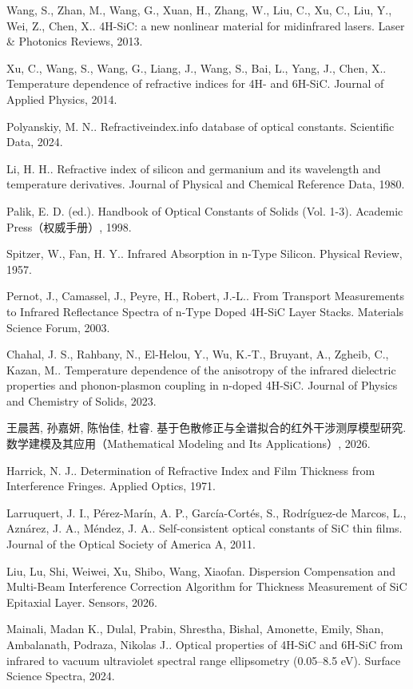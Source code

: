 Wang, S., Zhan, M., Wang, G., Xuan, H., Zhang, W., Liu, C., Xu, C., Liu,
Y., Wei, Z., Chen, X.. 4H-SiC: a new nonlinear material for midinfrared
lasers. Laser \& Photonics Reviews, 2013.

Xu, C., Wang, S., Wang, G., Liang, J., Wang, S., Bai, L., Yang, J.,
Chen, X.. Temperature dependence of refractive indices for 4H- and
6H-SiC. Journal of Applied Physics, 2014.

Polyanskiy, M. N.. Refractiveindex.info database of optical constants.
Scientific Data, 2024.

Li, H. H.. Refractive index of silicon and germanium and its wavelength
and temperature derivatives. Journal of Physical and Chemical Reference
Data, 1980.

Palik, E. D. (ed.). Handbook of Optical Constants of Solids (Vol. 1-3).
Academic Press（权威手册）, 1998.

Spitzer, W., Fan, H. Y.. Infrared Absorption in n-Type Silicon. Physical
Review, 1957.

Pernot, J., Camassel, J., Peyre, H., Robert, J.-L.. From Transport
Measurements to Infrared Reflectance Spectra of n-Type Doped 4H-SiC
Layer Stacks. Materials Science Forum, 2003.

Chahal, J. S., Rahbany, N., El-Helou, Y., Wu, K.-T., Bruyant, A.,
Zgheib, C., Kazan, M.. Temperature dependence of the anisotropy of the
infrared dielectric properties and phonon-plasmon coupling in n-doped
4H-SiC. Journal of Physics and Chemistry of Solids, 2023.

王晨茜, 孙嘉妍, 陈怡佳, 杜睿.
基于色散修正与全谱拟合的红外干涉测厚模型研究.
数学建模及其应用（Mathematical Modeling and Its Applications）, 2026.

Harrick, N. J.. Determination of Refractive Index and Film Thickness
from Interference Fringes. Applied Optics, 1971.

Larruquert, J. I., Pérez-Marín, A. P., García-Cortés, S., Rodríguez-de
Marcos, L., Aznárez, J. A., Méndez, J. A.. Self-consistent optical
constants of SiC thin films. Journal of the Optical Society of America
A, 2011.

Liu, Lu, Shi, Weiwei, Xu, Shibo, Wang, Xiaofan. Dispersion Compensation
and Multi-Beam Interference Correction Algorithm for Thickness
Measurement of SiC Epitaxial Layer. Sensors, 2026.

Mainali, Madan K., Dulal, Prabin, Shrestha, Bishal, Amonette, Emily,
Shan, Ambalanath, Podraza, Nikolas J.. Optical properties of 4H-SiC and
6H-SiC from infrared to vacuum ultraviolet spectral range ellipsometry
(0.05--8.5 eV). Surface Science Spectra, 2024.

